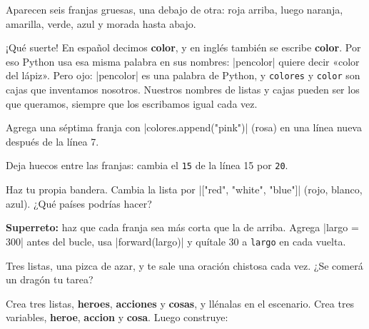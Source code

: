 Aparecen seis franjas gruesas, una debajo de otra: roja arriba, luego naranja, amarilla, verde, azul y morada hasta abajo.

\begin{think}
¡Qué suerte! En español decimos \textbf{color}, y en inglés también se escribe \textbf{color}. Por eso Python usa esa misma palabra en sus nombres: \py|pencolor| quiere decir «color del lápiz». Pero ojo: \py|pencolor| es una palabra de Python, y \texttt{colores} y \texttt{color} son cajas que inventamos nosotros. Nuestros nombres de listas y cajas pueden ser los que queramos, siempre que los escribamos igual cada vez.
\end{think}

\begin{challenge}
\tick Agrega una séptima franja con \py|colores.append("pink")| (rosa) en una línea nueva después de la línea 7.\par
\tick Deja huecos entre las franjas: cambia el \texttt{15} de la línea 15 por \texttt{20}.\par
\tick Haz tu propia bandera. Cambia la lista por \py|["red", "white", "blue"]| (rojo, blanco, azul). ¿Qué países podrías hacer?\par
\tick \textbf{Superreto:} haz que cada franja sea más corta que la de arriba. Agrega \py|largo = 300| antes del bucle, usa \py|forward(largo)| y quítale 30 a \texttt{largo} en cada vuelta.
\end{challenge}


Tres listas, una pizca de azar, y te sale una oración chistosa cada vez. ¿Se comerá un dragón tu tarea?

\noindent\begin{minipage}[t]{0.70\linewidth}\vspace{0pt}
\begin{scratch}[scale=0.89]
\end{scratch}
\end{minipage}\hfill\begin{minipage}[t]{0.27\linewidth}\vspace{0pt}
Crea tres listas, \textbf{heroes}, \textbf{acciones} y \textbf{cosas}, y llénalas en el escenario. Crea tres variables, \textbf{heroe}, \textbf{accion} y \textbf{cosa}. Luego construye:
\end{minipage}


